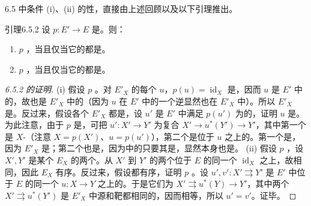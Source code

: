 6.5 中条件 (i)、(ii) 的性，直接由上述回顾以及以下引理推出。
\begin{SGAresult}{引理}{6.5.2}
设 $p:E'\to E$ 是。则：
\begin{enumerate}
\item[(i)] $p$ ，当且仅当它的都是。
\item[(ii)] $p$ ，当且仅当它的都是。
\end{enumerate}
\end{SGAresult}
\begin{proof}[6.5.2 的证明]
(i) 假设 $p$ 。对 $E'_X$ 的每个 $u$，$p(u)=\operatorname{id}_X$ 是，因而 $u$ 是 $E'$ 中的，故也是 $E'_X$ 中的（因为 $u$ 在 $E'$ 中的一个逆显然也在 $E'_X$ 中）。所以 $E'_X$ 是。反过来，假设各个 $E'_X$ 都是，设 $u'$ 是 $E'$ 中满足 $p(u')$ 为的，证明 $u$ 是。为此注意，由于 $p$ 是，可把 $u':X'\to Y'$ 为复合 $X'\to u^*(Y')\to Y'$，其中第一个是 $X$-（注意 $X=p(X')$、$u=p(u')$），第二个是位于 $u$ 之上的。第一个是，因为 $E'_X$ 是；第二个也是，因为中的只要其是，显然本身也是。
(ii) 假设 $p$ ，设 $X',Y'$ 是某个 $E_X$ 的两个。从 $X'$ 到 $Y'$ 的两个位于 $E$ 的同一个 $\operatorname{id}_X$ 之上，故相同，因此 $E_X$ 有序。反过来，假设都有序，证明 $p$ 。设 $u',v':X'\rightrightarrows Y'$ 是 $E'$ 中位于 $E$ 的同一个 $u:X\to Y$ 之上的。于是它们为 $X'\rightrightarrows u^*(Y)\to Y'$，其中两个 $X'\rightrightarrows u^*(Y')$ 是 $E'_X$ 中源和靶都相同的，因而相等，所以 $u'=v'$。证毕。
\end{proof}
